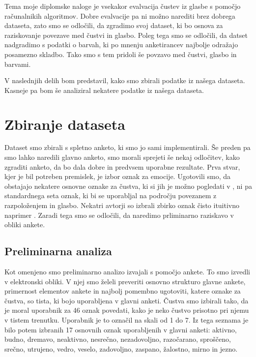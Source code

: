 \documentclass[a4paper, 12pt]{book}
\begin{document}
{Tema moje diplomske naloge je vsekakor evalvacija čustev iz glasbe s pomočjo računalnikih algoritmov. Dobre evalvacije pa ni možno narediti brez dobrega dataseta, zato smo se odločili, da zgradimo svoj dataset, ki bo osnova za raziskovanje povezave med čustvi in glasbo. Poleg tega smo se odločili, da datset nadgradimo s podatki o barvah, ki po mnenju anketirancev najbolje odražajo posamezno skladbo. Tako smo s tem pridoli še povzavo med čustvi, glasbo in barvami.

V naslednjih delih bom predstavil, kako smo zbirali podatke iz našega dataseta. Kasneje pa bom še analiziral nekatere podatke iz našega dataseta.

\section{Zbiranje dataseta}

Dataset smo zbirali s spletno anketo, ki smo jo sami implementirali. Še preden pa smo lahko naredili glavno anketo, smo morali sprejeti še nekaj odločitev, kako zgraditi anketo, da bo dala dobre in predvsem uporabne rezultate. Prva stvar, kjer je bil potreben premislek, je izbor oznak za emocije. Ugotovili smo, da obstajajo nekatere osnovne oznake za čustva, ki si jih je možno pogledati v \cite{dalgleish1999handbook}, ni pa standardnega seta oznak, ki bi se uporabljal na področju povezanem z razpoloženjem in glasbo. Nekatri avtorji so izbrali zbirko oznak čisto ituitivno naprimer \cite{wu2013spectral}. Zaradi tega smo se odločili, da naredimo prliminarno raziskavo v obliki ankete. 

\subsection{Preliminarna analiza}

Kot omenjeno smo preliminarno analizo izvajali s pomočjo ankete. To smo izvedli v elektronski obliki. V njej smo želeli preveriti osnovno strukturo glavne ankete, primernost elementov ankete in najbolj pomembno ugotoviti, katere oznake za čustva, so tista, ki bojo uporabljena v glavni anketi. Čustva smo izbirali tako, da je moral uporabnik za 46 oznak povedati, kako je neko čustvo prisotno pri njemu v tistem trenutku. Uporabnik je to označil na skali od 1 do 7. Iz tega seznama je bilo potem izbranih 17 osnovnih oznak uporabljenih v glavni anketi: aktivno, budno, dremavo, neaktivno, nesrečno, nezadovoljno, razočarano, sproščeno, srečno, utrujeno, vedro, veselo, zadovoljno, zaspano, žalostno, mirno in jezno.

}
\end{document}
